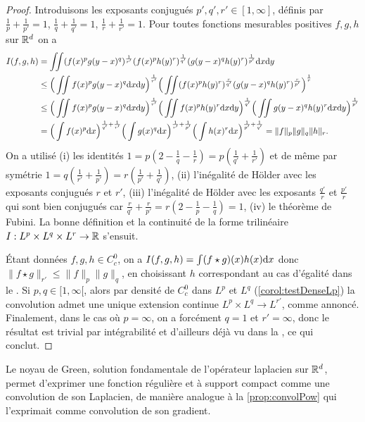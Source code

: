\begin{proof}
	Introduisons les exposants conjugués $p',q',r' \in [1,\infty]$, définis par $\frac 1 p + \frac 1 {p'}=1$, $\frac 1 q + \frac 1 {q'}=1$, $\frac 1 r + \frac 1 {r'}=1$.
	Pour toutes fonctions mesurables positives $f,g,h$ sur $\mathbb{R}^d$ on a 
	\begin{align*}
	I(f,g,h) &= 
	\iint (f(x)^p g(y-x)^q)^{\frac 1 {r'}}  (f(x)^p h(y)^r)^{\frac 1 {q'}} (g(y-x)^q h(y)^r)^{\frac 1 {p'}} \mathrm{d} x \mathrm{d} y \\
	&\leq \Big(\iint f(x)^p g(y-x)^q\mathrm{d} x \mathrm{d} y\Big)^{\frac 1 {r'}} 
	\Big(\iint  (f(x)^p h(y)^r)^{\frac r {q'}} (g(y-x)^q h(y)^r)^{\frac r {p'}} \Big)^\frac 1 r
	\\
	&\leq \Big(\iint f(x)^p g(y-x)^q\mathrm{d} x \mathrm{d} y\Big)^{\frac 1 {r'}}
	\Big(\iint f(x)^p h(y)^r\mathrm{d} x \mathrm{d} y\Big)^{\frac 1 {q'}}
	\Big(\iint g(y-x)^q h(y)^r\mathrm{d} x \mathrm{d} y\Big)^{\frac 1 {p'}}
	\\
	&= \Big(\int f(x)^p \mathrm{d} x\Big)^{\frac 1 {q'}+\frac 1 {r'}} 
	\Big(\int g(x)^q \mathrm{d} x\Big)^{\frac 1 {r'}+\frac 1 {p'}} 
	\Big(\int h(x)^r \mathrm{d} x\Big)^{\frac 1 {p'}+\frac 1 {q'}} = \|f\|_p \|g\|_q \|h\|_r.
	\end{align*}
	On a utilisé (i) les identités $1 = p(2-\frac 1 q-\frac 1 r) = p (\frac 1 {q'} + \frac 1 {r'})$ et de même par symétrie $1= q (\frac 1 {r'} + \frac 1 {p'})=r (\frac 1 {p'} + \frac 1 {q'})$,
	(ii) l'inégalité de Hölder avec les exposants conjugués $r$ et $r'$, (iii) l'inégalité de Hölder avec les exposants $\frac {q'} r$ et $\frac {p'} r$ qui sont bien conjugués car $\frac r {q'} + \frac r {p'} = r (2-\frac 1 p -\frac 1 q) = 1$, (iv) le théorème de Fubini.
	La bonne définition et la continuité de la forme trilinéaire $I : L^p \times L^q \times L^r \to \mathbb{R}$ s'ensuit. 
	
	Étant données $f,g,h\in C^0_c$, on a $I(f,g,h) = \int (f\star g)(x) h(x) \mathrm{d} x$ donc $\|f\star g\|_{r'} \leq \|f\|_p \|g\|_q$, en choisissant $h$ correspondant au cas d'égalité dans le
	. Si $p,q\in [1,\infty[$, alors par densité de $C^0_c$ dans $L^p$ et $L^q$ (\cref{corol:testDenseLp}) la convolution admet une unique extension continue $L^p \times L^q \to L^{r'}$, comme annoncé. Finalement, dans le cas où $p=\infty$, on a forcément $q=1$ et $r'=\infty$, donc le résultat est trivial par intégrabilité et d'ailleurs déjà vu dans la , ce qui conclut.
\end{proof}


Le noyau de Green, solution fondamentale de l'opérateur laplacien sur $\mathbb{R}^d$, permet d'exprimer une fonction régulière et à support compact comme une convolution de son Laplacien, de manière analogue à la \cref{prop:convolPow} qui l'exprimait comme convolution de son gradient. 


